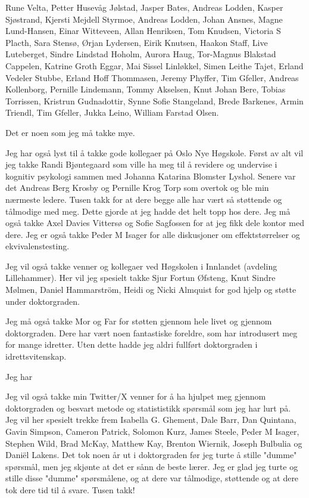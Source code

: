 Rune Velta, Petter Husevåg Jølstad, Jasper Bates, Andreas Lodden, Kasper Sjøstrand, Kjersti Mejdell Styrmoe, Andreas Lodden, Johan Ansnes, Magne Lund-Hansen, Einar Witteveen, Allan Henriksen, Tom Knudsen, Victoria S Placth, Sara Stensø, Ørjan Lydersen, Eirik Knutsen, Haakon Staff, Live Luteberget, Sindre Lindstad Hoholm, Aurora Haug, Tor-Magnus Blakstad Cappelen, Katrine Groth Eggar, Mai Sissel Linløkkel, Simen Leithe Tajet, Erland Vedeler Stubbe, Erland Hoff Thommasen, Jeremy Phyffer, Tim Gfeller, Andreas Kollenborg, Pernille Lindemann, Tommy Akselsen, Knut Johan Bere, Tobias Torrissen, Kristrun Gudnadottir, Synne Sofie Stangeland, Brede Barkenes, Armin Triendl, Tim Gfeller, Jukka Leino, William Farstad Olsen.

Det er noen som jeg må takke mye. 



Jeg har også lyst til å takke gode kollegaer på Oslo Nye Høgskole. Først av alt vil jeg takke Randi Bjøntegaard som ville ha meg til å revidere og undervise i kognitiv psykologi sammen med Johanna Katarina Blomster Lyshol. Senere var det Andreas Berg Krosby og Pernille Krog Torp som overtok og ble min nærmeste ledere. Tusen takk for at dere begge alle har vært så støttende og tålmodige med meg. Dette gjorde at jeg hadde det helt topp hos dere. Jeg må også takke Axel Davies Vittersø og Sofie Sagfossen for at jeg fikk dele kontor med dere. Jeg er også takke Peder M Isager for alle diskusjoner om effektstørrelser og ekvivalenstesting. 

Jeg vil også takke venner og kollegaer ved Høgskolen i Innlandet (avdeling Lillehammer). Her vil jeg spesielt takke Sjur Fortun Øfsteng, Knut Sindre Mølmen, Daniel Hammarström, Heidi og Nicki Almquist for god hjelp og støtte under doktorgraden. 

Jeg må også takke Mor og Far for støtten gjennom hele livet og gjennom doktorgraden. Dere har vært noen fantastiske foreldre, som har introdusert meg for mange idretter. Uten dette hadde jeg aldri fullført doktorgraden i idrettsvitenskap. 

Jeg har 


Jeg vil også takke min Twitter/X venner for å ha hjulpet meg gjennom doktorgraden og besvart metode og statististikk spørsmål som jeg har lurt på. Jeg vil her spesielt trekke frem Isabella G. Ghement, Dale Barr, Dan Quintana, Gavin Simpson, Cameron Patrick, Solomon Kurz, James Steele, Peder M Isager, Stephen Wild, Brad McKay, Matthew Kay, Brenton Wiernik, Joseph Bulbulia og Daniël Lakens. Det tok noen år ut i doktorgraden før jeg turte å stille "dumme" spørsmål, men jeg skjønte at det er sånn de beste lærer. Jeg er glad jeg turte og stille disse "dumme" spørsmålene, og at dere var tålmodige, støttende og at dere tok dere tid til å svare. Tusen takk!

